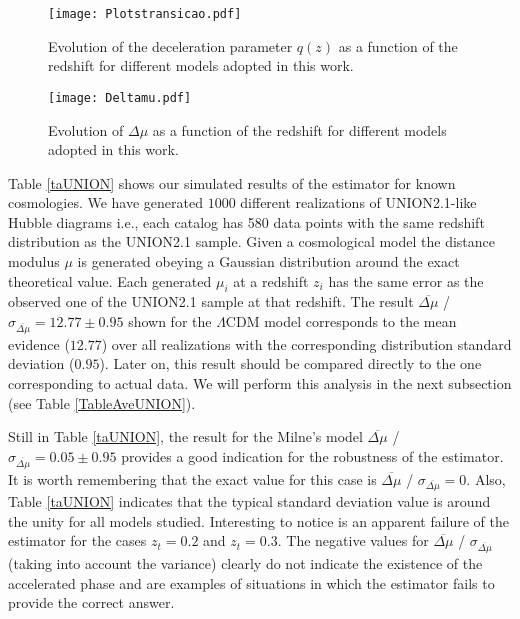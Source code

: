 \documentclass[nofootinbib,twocolumn]{revtex4}
\begin{document}
\begin{figure}
\centering
\texttt{[image: Plotstransicao.pdf]}
\caption{Evolution of the deceleration parameter $q(z)$ as a function of the redshift for different models adopted in this work.}
\label{Figq}
\end{figure}


\begin{figure}
\centering
\texttt{[image: Deltamu.pdf]}
\caption{Evolution of $\Delta \mu$ as a function of the redshift for different models adopted in this work.}
\label{FigDeltamuz}
\end{figure}

Table \ref{taUNION} shows our simulated results of the estimator for known cosmologies. We have generated $1000$ different realizations of UNION2.1-like Hubble diagrams i.e., each catalog has 580 data points with the same redshift distribution as the UNION2.1 sample. Given a cosmological model the distance modulus $\mu$ is generated obeying a Gaussian distribution around the exact theoretical value. Each generated $\mu_i$ at a redshift $z_i$ has the same error as the observed one of the UNION2.1 sample at that redshift. The result $\overline{\Delta \mu}$ / $\sigma_{\overline{\Delta\mu}} = 12.77 \pm 0.95$ shown for the $\Lambda$CDM model corresponds to the mean evidence ($12.77$) over all realizations with the corresponding distribution standard deviation ($0.95$). Later on, this result should be compared directly to the one corresponding to actual data. We will perform this analysis in the next subsection (see Table \ref{TableAveUNION}). 

Still in Table \ref{taUNION}, the result for the Milne's model $\overline{\Delta \mu}$ / $\sigma_{\overline{\Delta\mu}} = 0.05 \pm 0.95$ provides a good indication for the robustness of the estimator. It is worth remembering that the exact value for this case is $\overline{\Delta \mu}$ / $\sigma_{\overline{\Delta\mu}} = 0 $. Also, Table \ref{taUNION} indicates that the typical standard deviation value is around the unity for all models studied.
Interesting to notice is an apparent failure of the estimator for the cases $z_t=0.2$ and $z_t=0.3$. The negative values for $\overline{\Delta \mu}$ / $\sigma_{\overline{\Delta\mu}}$ (taking into account the variance) clearly do not indicate the existence of the accelerated phase and are examples of situations in which the estimator fails to provide the correct answer.
\end{document}
